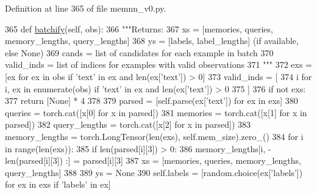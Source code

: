 Definition at line 365 of file memnn\+\_\+v0.\+py.


\begin{DoxyCode}
365     \textcolor{keyword}{def }\hyperlink{namespaceparlai_1_1agents_1_1drqa_1_1utils_aca22dd97c5b6dcda2a7479c1cb22ef1e}{batchify}(self, obs):
366         \textcolor{stringliteral}{"""Returns:}
367 \textcolor{stringliteral}{            xs = [memories, queries, memory\_lengths, query\_lengths]}
368 \textcolor{stringliteral}{            ys = [labels, label\_lengths] (if available, else None)}
369 \textcolor{stringliteral}{            cands = list of candidates for each example in batch}
370 \textcolor{stringliteral}{            valid\_inds = list of indices for examples with valid observations}
371 \textcolor{stringliteral}{        """}
372         exs = [ex \textcolor{keywordflow}{for} ex \textcolor{keywordflow}{in} obs \textcolor{keywordflow}{if} \textcolor{stringliteral}{'text'} \textcolor{keywordflow}{in} ex \textcolor{keywordflow}{and} len(ex[\textcolor{stringliteral}{'text'}]) > 0]
373         valid\_inds = [
374             i \textcolor{keywordflow}{for} i, ex \textcolor{keywordflow}{in} enumerate(obs) \textcolor{keywordflow}{if} \textcolor{stringliteral}{'text'} \textcolor{keywordflow}{in} ex \textcolor{keywordflow}{and} len(ex[\textcolor{stringliteral}{'text'}]) > 0
375         ]
376         \textcolor{keywordflow}{if} \textcolor{keywordflow}{not} exs:
377             \textcolor{keywordflow}{return} [\textcolor{keywordtype}{None}] * 4
378 
379         parsed = [self.parse(ex[\textcolor{stringliteral}{'text'}]) \textcolor{keywordflow}{for} ex \textcolor{keywordflow}{in} exs]
380         queries = torch.cat([x[0] \textcolor{keywordflow}{for} x \textcolor{keywordflow}{in} parsed])
381         memories = torch.cat([x[1] \textcolor{keywordflow}{for} x \textcolor{keywordflow}{in} parsed])
382         query\_lengths = torch.cat([x[2] \textcolor{keywordflow}{for} x \textcolor{keywordflow}{in} parsed])
383         memory\_lengths = torch.LongTensor(len(exs), self.mem\_size).zero\_()
384         \textcolor{keywordflow}{for} i \textcolor{keywordflow}{in} range(len(exs)):
385             \textcolor{keywordflow}{if} len(parsed[i][3]) > 0:
386                 memory\_lengths[i, -len(parsed[i][3]) :] = parsed[i][3]
387         xs = [memories, queries, memory\_lengths, query\_lengths]
388 
389         ys = \textcolor{keywordtype}{None}
390         self.labels = [random.choice(ex[\textcolor{stringliteral}{'labels'}]) \textcolor{keywordflow}{for} ex \textcolor{keywordflow}{in} exs \textcolor{keywordflow}{if} \textcolor{stringliteral}{'labels'} \textcolor{keywordflow}{in} ex]

\end{DoxyCode}
